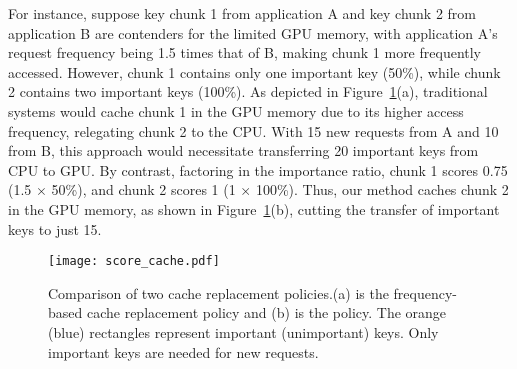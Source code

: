 
For instance, suppose key chunk 1 from application A and key chunk 2 from
application B are contenders for the limited GPU memory, with application A's
request frequency being 1.5 times that of B, making chunk 1 more frequently
accessed. However, chunk 1 contains only one important key (50\%), while chunk 2
contains two important keys (100\%).
As depicted in Figure~\ref{fig:score_cache}(a), traditional systems would cache
chunk 1 in the GPU memory due to its higher access frequency, relegating chunk 2 to
the CPU. With 15 new requests from A and 10 from B, this approach would
necessitate transferring 20 important keys from CPU to GPU.
By contrast, factoring in the importance ratio, chunk 1 scores 0.75 (1.5 $\times$
50\%), and chunk 2 scores 1 (1 $\times$ 100\%). Thus, our method caches chunk 2 in
the GPU memory, as shown in Figure~\ref{fig:score_cache}(b), cutting the transfer of
important keys to just 15.

\begin{figure}
	\centering
	\texttt{[image: score\_cache.pdf]}
	\caption{Comparison of two cache replacement policies.(a) is the
	frequency-based cache replacement policy and (b) is the \techbb{} policy. The orange (blue) rectangles
	represent important (unimportant) keys. Only important keys are needed for
	new requests.}
	\label{fig:score_cache}
	\vspace{-0.1in}
\end{figure}


